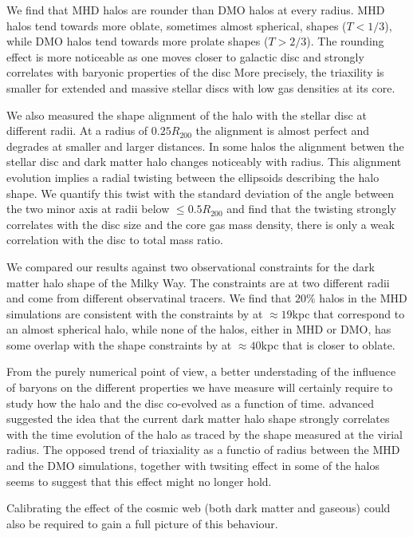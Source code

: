 \documentclass[usenatbib]{mnras}
\begin{document}
We find that MHD halos are rounder than DMO halos at every radius.
MHD halos tend towards more oblate, sometimes almost spherical, shapes
($T<1/3$), while DMO halos tend towards more prolate shapes ($T>2/3$).  
The rounding effect is more noticeable as one moves closer to galactic
disc and strongly  correlates with baryonic properties of the disc
More precisely, the triaxility is smaller for extended and massive
stellar discs with low gas densities at its core.

We also measured the shape alignment of the halo with the stellar
disc at different radii.
At a radius of $0.25R_{200}$ the alignment is almost perfect and
degrades at smaller and larger distances.
In some halos the alignment betwen the stellar disc and dark matter
halo changes noticeably with radius. 
This alignment evolution implies a radial twisting between the ellipsoids
describing the halo shape. 
We quantify this twist with the standard deviation of the angle
between the two minor axis at radii below $\leq 0.5R_{200}$ and find
that the twisting strongly correlates with the disc size and the core
gas mass density, there is only a weak correlation with the disc to
total mass ratio.

We compared our results against two observational constraints for the
dark matter halo shape of the Milky Way. 
The constraints are at two different radii and come from different
observatinal tracers. 
We find that $20\%$ halos in the MHD simulations are consistent with
the constraints by \cite{Bovy16} at $\approx 19$kpc that correspond to
an almost spherical halo, while none of the halos, either in MHD or
DMO, has some overlap with the shape constraints by \cite{LM10} at
$\approx 40$kpc that is closer to oblate.  


From the purely numerical point of view, a better understading of the
influence of baryons on the different properties we have measure  will
certainly require to study how the halo and the disc co-evolved as a
function of time. 
\cite{VeraCiro11} advanced suggested the idea that the current dark
matter halo shape strongly correlates with the time evolution of the
halo as traced by the shape measured at the virial radius.
The opposed trend of triaxiality as a functio of radius between the
MHD and the DMO simulations, together with twsiting effect in some of
the halos seems to suggest that this effect might no longer hold.

Calibrating the effect of the cosmic web (both dark matter and gaseous)
\citep{2014MNRAS.443.1090F,2017MNRAS.469..594B,2019MNRAS.487.1607G}
could also be required to gain a full picture of this behaviour.  
\end{document}

